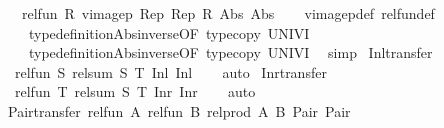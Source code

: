\begin{isabellebody}
\ \ \ {\isachardoublequoteopen}rel{\isacharunderscore}{\kern0pt}fun\ R\ {\isacharparenleft}{\kern0pt}vimage{}p\ Rep{}\ Rep{}\ R{\isacharparenright}{\kern0pt}\ Abs{}\ Abs{}{\isachardoublequoteclose}\isanewline
%
\isadelimproof
\ \ %
\endisadelimproof
%
\isatagproof
{}\isamarkupfalse%
\ vimage{}p{\isacharunderscore}{\kern0pt}def\ rel{\isacharunderscore}{\kern0pt}fun{\isacharunderscore}{\kern0pt}def\isanewline
\ \ \ \ type{\isacharunderscore}{\kern0pt}definition{\isachardot}{\kern0pt}Abs{\isacharunderscore}{\kern0pt}inverse{\isacharbrackleft}{\kern0pt}OF\ type{\isacharunderscore}{\kern0pt}copy{}\ UNIV{\isacharunderscore}{\kern0pt}I{\isacharbrackright}{\kern0pt}\isanewline
\ \ \ \ type{\isacharunderscore}{\kern0pt}definition{\isachardot}{\kern0pt}Abs{\isacharunderscore}{\kern0pt}inverse{\isacharbrackleft}{\kern0pt}OF\ type{\isacharunderscore}{\kern0pt}copy{}\ UNIV{\isacharunderscore}{\kern0pt}I{\isacharbrackright}{\kern0pt}\ \isamarkupfalse%
\ simp%
\endisatagproof
{\isafoldproof}%
%
\isadelimproof
\isanewline
%
\endisadelimproof
\isanewline
{}\isamarkupfalse%
\ Inl{\isacharunderscore}{\kern0pt}transfer{\isacharcolon}{\kern0pt}\isanewline
\ \ {\isachardoublequoteopen}rel{\isacharunderscore}{\kern0pt}fun\ S\ {\isacharparenleft}{\kern0pt}rel{\isacharunderscore}{\kern0pt}sum\ S\ T{\isacharparenright}{\kern0pt}\ Inl\ Inl{\isachardoublequoteclose}\isanewline
%
\isadelimproof
\ \ %
\endisadelimproof
%
\isatagproof
{}\isamarkupfalse%
\ auto%
\endisatagproof
{\isafoldproof}%
%
\isadelimproof
\isanewline
%
\endisadelimproof
\isanewline
{}\isamarkupfalse%
\ Inr{\isacharunderscore}{\kern0pt}transfer{\isacharcolon}{\kern0pt}\isanewline
\ \ {\isachardoublequoteopen}rel{\isacharunderscore}{\kern0pt}fun\ T\ {\isacharparenleft}{\kern0pt}rel{\isacharunderscore}{\kern0pt}sum\ S\ T{\isacharparenright}{\kern0pt}\ Inr\ Inr{\isachardoublequoteclose}\isanewline
%
\isadelimproof
\ \ %
\endisadelimproof
%
\isatagproof
{}\isamarkupfalse%
\ auto%
\endisatagproof
{\isafoldproof}%
%
\isadelimproof
\isanewline
%
\endisadelimproof
\isanewline
{}\isamarkupfalse%
\ Pair{\isacharunderscore}{\kern0pt}transfer{\isacharcolon}{\kern0pt}\ {\isachardoublequoteopen}rel{\isacharunderscore}{\kern0pt}fun\ A\ {\isacharparenleft}{\kern0pt}rel{\isacharunderscore}{\kern0pt}fun\ B\ {\isacharparenleft}{\kern0pt}rel{\isacharunderscore}{\kern0pt}prod\ A\ B{\isacharparenright}{\kern0pt}{\isacharparenright}{\kern0pt}\ Pair\ Pair{\isachardoublequoteclose}\isanewline

\end{isabellebody}
